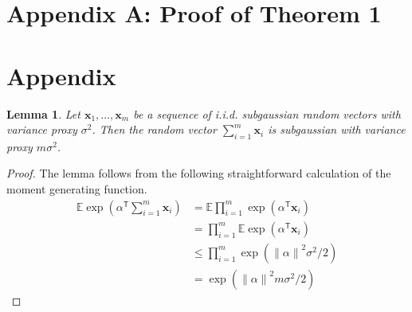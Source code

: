 \documentclass[twoside]{article}
\newtheorem{lemma}{Lemma}
\newcommand{\E}{\mathbb{E}}
\newcommand{\x}{\mathbf{x}}
\newcommand{\trans}[1]{\ensuremath{{#1}^{\mathsf{T}}}}
\newcommand{\ltwo}[1]{{\lVert {#1} \rVert}}
\begin{document}


\clearpage




\clearpage

\section*{Appendix A: Proof of Theorem 1}



\section*{Appendix}

\begin{lemma}
Let $\x_1,...,\x_m$ be a sequence of i.i.d. subgaussian random vectors with variance proxy $\sigma^2$.
Then the random vector $\sum_{i=1}^m \x_i$ is subgaussian with variance proxy $m\sigma^2$.
\end{lemma}

\begin{proof}
The lemma follows from the following straightforward calculation of the moment generating function.
\begin{align}
\E{\exp(\trans\alpha\sum_{i=1}^m\x_i)}
&= \E{\prod_{i=1}^m\exp(\trans\alpha\x_i)}
\\
\label{eq:varindep}
&= \prod_{i=1}^m\E{\exp(\trans\alpha\x_i)}
\\
&\le \prod_{i=1}^m\exp(\ltwo{\alpha}^2\sigma^2/2)
\\
&= \exp(\ltwo{\alpha}^2 m\sigma^2 /2)
\end{align}
\end{proof}
\end{document}

